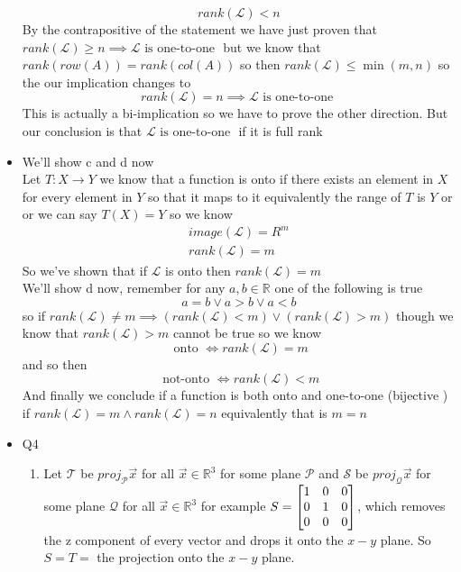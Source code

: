 \documentclass[11pt]{book}
\begin{document}
\begin{itemize}
    \[
    \boxed{\mathit{rank} \left(\mathcal{L} \right) < n}
    \]
    By the contrapositive of the statement we have just proven that $\mathit{rank} \left(\mathcal{L} \right) \ge n \implies \mathcal{L} \text{ is one-to-one  } $ but we know that $\mathit{rank} \left(row\left(A\right) \right) = \mathit{rank} \left(col\left( A \right)  \right) $ so then $\mathit{rank} \left(\mathcal{L} \right) \le \min\left(m, n\right) $ so the our implication changes to 
    \[
    \mathit{rank} \left(\mathcal{L} \right) = n \implies \mathcal{L} \text{ is one-to-one  } 
    \]
    This is actually a bi-implication so we have to prove the other direction. But our conclusion is that $\mathcal{L} \text{ is one-to-one  } $ if it is full rank
    \item We'll show c and d now\\
    Let $T : X \to Y $ we know that a function is onto if there exists an element in $X$ for every element in $Y$ so that it maps to it equivalently the range of $T$ is $Y$ or or we can say $T\left(X\right) = Y$ so we know
    \begin{gather*}
        image\left(\mathcal{L} \right) = R^{m} \\
        \mathit{rank} \left(\mathcal{L} \right) = m
    \end{gather*}
    So we've shown that if $\mathcal{L} $ is onto then $\mathit{rank} \left(\mathcal{L} \right) = m$ \\
    We'll show d now, remember for any $a, b \in \mathbb{R} $ one of the following is true
    \[
    a= b\lor a > b \lor a < b
    \]
    so if $\mathit{rank} \left(\mathcal{L} \right) \neq m \implies \left( \mathit{rank} \left(\mathcal{L} \right) < m \right) \lor \left( \mathit{rank} \left(\mathcal{L} \right) > m \right) $ though we know that $\mathit{rank} \left(\mathcal{L} \right) > m$ cannot be true so we know
    \[
    \text{ onto } \Leftrightarrow \mathit{rank} \left(\mathcal{L} \right) = m
    \]
    and so then 
    \[
    \text{ not-onto } \Leftrightarrow \mathit{rank} \left(\mathcal{L} \right) < m
    \]
    And finally we conclude if a function is both onto and one-to-one (bijective ) if $\mathit{rank} \left(\mathcal{L} \right) = m \land \mathit{rank} \left(\mathcal{L} \right) = n$ equivalently that is $m= n$ 
    \item Q4
        \begin{enumerate}[label=\alph*)]
            \item Let $\mathcal{T} $ be $\mathit{proj}_{\mathcal{P} } {\vec{x} } $ for all $\vec{x} \in \mathbb{R} ^{3} $ for some plane $\mathcal{P} $ and $\mathcal{S} $ be $\mathit{proj}_{\mathcal{Q} } {\vec{x} } $ for some plane $\mathcal{Q} $ for all $\vec{x} \in \mathbb{R} ^{3} $ for example $S= \mat[b]{ 1 & 0 & 0 \\ 0 & 1 & 0 \\ 0 & 0 & 0 }$, which removes the z component of every vector and drops it onto the $x-y$ plane. So $S= T= $ the projection onto the $x-y$ plane. 

\end{enumerate}
\end{itemize}
\end{document}
